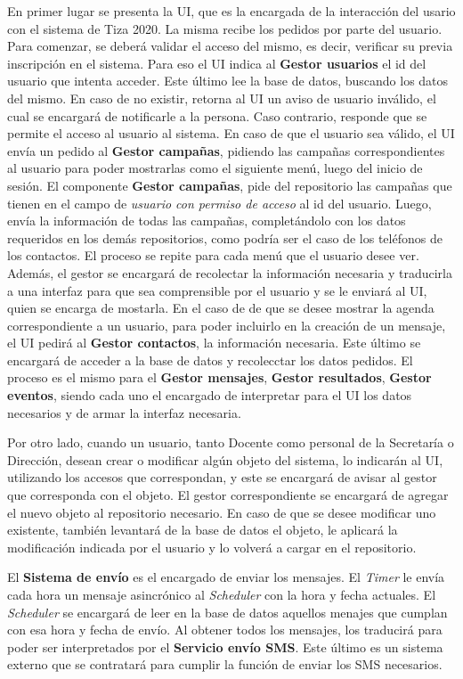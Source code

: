 \documentclass[a4paper, 11pt]{article}
\begin{document}
En primer lugar se presenta la UI, que es la encargada de la interacción del usario con el sistema de Tiza 2020. La misma recibe los pedidos por parte del usuario. Para comenzar, se deberá validar el acceso del mismo, es decir, verificar su previa inscripción en el sistema. Para eso el UI indica al \textbf{Gestor usuarios} el id del usuario que intenta acceder. Este último lee la base de datos, buscando los datos del mismo. En caso de no existir, retorna al UI un aviso de usuario inválido, el cual se encargará de notificarle a la persona. Caso contrario, responde que se permite el acceso al usuario al sistema. 
En caso de que el usuario sea válido, el UI envía un pedido al \textbf{Gestor campañas}, pidiendo las campañas correspondientes al usuario para poder mostrarlas como el siguiente menú, luego del inicio de sesión. El componente \textbf{Gestor campañas}, pide del repositorio las campañas que tienen en el campo de \emph{usuario con permiso de acceso} al id del usuario. Luego, envía la información de todas las campañas, completándolo con los datos requeridos en los demás repositorios, como podría ser el caso de los teléfonos de los contactos. 
El proceso se repite para cada menú que el usuario desee ver. Además, el gestor se encargará de recolectar la información necesaria y traducirla a una interfaz para que sea comprensible por el usuario y se le enviará al UI, quien se encarga de mostarla. En el caso de de que se desee mostrar la agenda correspondiente a un usuario, para poder incluirlo en la creación de un mensaje, el UI pedirá al \textbf{Gestor contactos}, la información necesaria. Este último se encargará de acceder a la base de datos y recolecctar los datos pedidos. El proceso es el mismo para el \textbf{Gestor mensajes}, \textbf{Gestor resultados}, \textbf{Gestor eventos}, siendo cada uno el encargado de interpretar para el UI los datos necesarios y de armar la interfaz necesaria. 

Por otro lado, cuando un usuario, tanto Docente como personal de la Secretaría o Dirección, desean crear o modificar algún objeto del sistema, lo indicarán al UI, utilizando los accesos que correspondan, y este se encargará de avisar al gestor que corresponda con el objeto. El gestor correspondiente se encargará de agregar el nuevo objeto al repositorio necesario.  En caso de que se desee modificar uno existente, también levantará de la base de datos el objeto, le aplicará la modificación indicada por el usuario y lo volverá a cargar en el repositorio. 

El \textbf{Sistema de envío} es el encargado de enviar los mensajes. El \emph{Timer} le envía cada hora un mensaje asincrónico al \emph{Scheduler} con la hora y fecha actuales. El \emph{Scheduler} se encargará de leer en la base de datos aquellos menajes que cumplan con esa hora y fecha de envío. Al obtener todos los mensajes, los traducirá para poder ser interpretados por el \textbf{Servicio envío SMS}. Este último es un sistema externo que se contratará para cumplir la función de enviar los SMS necesarios. 
\end{document}
